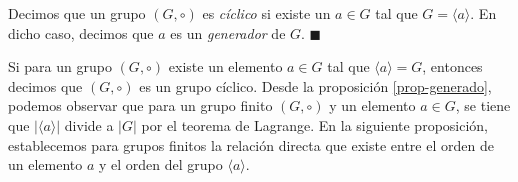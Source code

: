 \begin{definition} 
Decimos que un grupo $(G, \circ)$ es \emph{cíclico} si existe un $a \in G$ tal que $G = \langle a \rangle$. En dicho caso, decimos que $a$ es un \emph{generador} de $G$. \hfill$\blacksquare$
\end{definition}

Si para un grupo $(G, \circ)$ existe un elemento $a \in G$ tal que
$\langle a \rangle = G$, entonces decimos que $(G,\circ)$ es un grupo
cíclico. Desde la proposición \ref{prop-generado}, podemos observar
que para un grupo finito $(G, \circ)$ y un elemento $a \in G$, se
tiene que $|\langle a\rangle |$ divide a $|G|$ por el teorema de
Lagrange. En la siguiente proposición, establecemos para grupos
finitos la relación directa que existe entre el orden de un elemento
$a$ y el orden del grupo $\langle a \rangle$.

